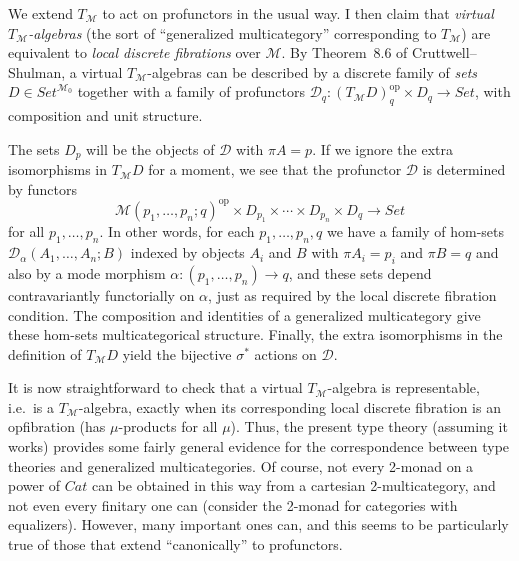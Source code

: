 \documentclass{amsart}
\theoremstyle{definition}
\def\M{\mathcal{M}}
\def\D{\mathcal{D}}
\begin{document}
We extend $T_\M$ to act on profunctors in the usual way.
I then claim that \emph{virtual $T_\M$-algebras} (the sort of ``generalized multicategory'' corresponding to $T_\M$) are equivalent to \emph{local discrete fibrations} over $\M$.
By Theorem~8.6 of Cruttwell--Shulman, a virtual $T_\M$-algebras can be described by a discrete family of \emph{sets} $D\in \mathit{Set}^{\M_0}$ together with a family of profunctors $\D_q:(T_\M D)_q^{\mathrm{op}} \times D_q \to \mathit{Set}$, with composition and unit structure.

The sets $D_p$ will be the objects of $\D$ with $\pi A = p$.
If we ignore the extra isomorphisms in $T_\M D$ for a moment, we see that the profunctor $\D$ is determined by functors
\[ \M(p_1,\dots,p_n;q)^{\mathrm{op}} \times D_{p_1}\times\cdots\times D_{p_n} \times D_q \to \mathit{Set} \]
for all $p_1,\dots, p_n$.
In other words, for each $p_1,\dots, p_n,q$ we have a family of hom-sets $\D_\alpha(A_1,\dots,A_n;B)$ indexed by objects $A_i$ and $B$ with $\pi A_i = p_i$ and $\pi B = q$ and also by a mode morphism $\alpha:(p_1,\dots,p_n)\to q$, and these sets depend contravariantly functorially on $\alpha$, just as required by the local discrete fibration condition.
The composition and identities of a generalized multicategory give these hom-sets multicategorical structure.
Finally, the extra isomorphisms in the definition of $T_\M D$ yield the bijective $\sigma^*$ actions on $\D$.

It is now straightforward to check that a virtual $T_\M$-algebra is representable, i.e.\ is a $T_\M$-algebra, exactly when its corresponding local discrete fibration is an opfibration (has $\mu$-products for all $\mu$).
Thus, the present type theory (assuming it works) provides some fairly general evidence for the correspondence between type theories and generalized multicategories.
Of course, not every 2-monad on a power of $\mathit{Cat}$ can be obtained in this way from a cartesian 2-multicategory, and not even every finitary one can (consider the 2-monad for categories with equalizers).
However, many important ones can, and this seems to be particularly true of those that extend ``canonically'' to profunctors.
\end{document}
